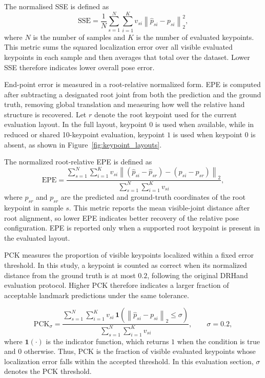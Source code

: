 \documentclass[10pt,letterpaper]{article}
\begin{document}
The normalised SSE is defined as
\begin{equation}
\mathrm{SSE} =
\frac{1}{N}
\sum_{s=1}^{N}
\sum_{i=1}^{K}
v_{si}\left\|
\hat{p}_{si} - p_{si}
\right\|_2^2,
\label{eq:sse}
\end{equation}
where \(N\) is the number of samples and \(K\) is the number of evaluated keypoints. This metric sums the squared localization error over all visible evaluated keypoints in each sample and then averages that total over the dataset. Lower SSE therefore indicates lower overall pose error.

\medskip
\noindent
End-point error is measured in a root-relative normalized form. EPE is computed after subtracting a designated root joint from both the prediction and the ground truth, removing global translation and measuring how well the relative hand structure is recovered. Let \(r\) denote the root keypoint used for the current evaluation layout. In the full layout, keypoint \(0\) is used when available, while in reduced or shared 10-keypoint evaluation, keypoint \(1\) is used when keypoint \(0\) is absent, as shown in Figure~\ref{fig:keypoint_layouts}.

The normalized root-relative EPE is defined as
\begin{equation}
\mathrm{EPE} =
\frac{
\sum_{s=1}^{N}
\sum_{i=1}^{K}
v_{si}
\left\|
(\hat{p}_{si} - \hat{p}_{sr}) - (p_{si} - p_{sr})
\right\|_2
}{
\sum_{s=1}^{N}
\sum_{i=1}^{K}
v_{si}
},
\label{eq:epe}
\end{equation}
where \(\hat{p}_{sr}\) and \(p_{sr}\) are the predicted and ground-truth coordinates of the root keypoint in sample \(s\). This metric reports the mean visible-joint distance after root alignment, so lower EPE indicates better recovery of the relative pose configuration. EPE is reported only when a supported root keypoint is present in the evaluated layout.

\medskip
\noindent
PCK measures the proportion of visible keypoints localized within a fixed error threshold. In this study, a keypoint is counted as correct when its normalized distance from the ground truth is at most \(0.2\), following the original DRHand evaluation protocol. Higher PCK therefore indicates a larger fraction of acceptable landmark predictions under the same tolerance.

\begin{equation}
\mathrm{PCK}_{\sigma} =
\frac{
\sum_{s=1}^{N}
\sum_{i=1}^{K}
v_{si}\,\mathbf{1}
\left(
\left\|
\hat{p}_{si} - p_{si}
\right\|_2 \le \sigma
\right)
}{
\sum_{s=1}^{N}
\sum_{i=1}^{K}
v_{si}
},
\qquad \sigma = 0.2,
\label{eq:pck}
\end{equation}
where \(\mathbf{1}(\cdot)\) is the indicator function, which returns \(1\) when the condition is true and \(0\) otherwise. Thus, PCK is the fraction of visible evaluated keypoints whose localization error falls within the accepted threshold. In this evaluation section, \(\sigma\) denotes the PCK threshold.
\end{document}
